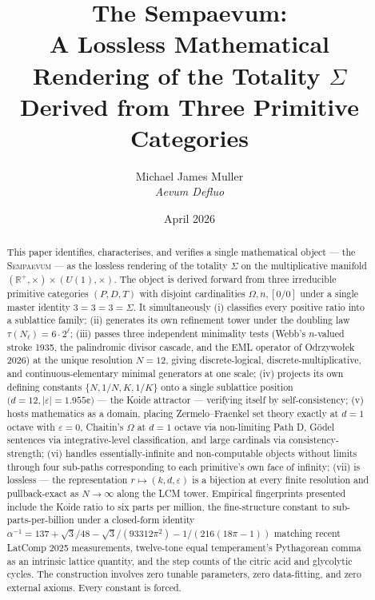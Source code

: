 \documentclass[11pt,a4paper]{article}
\title{\bfseries The Sempaevum:\\[2pt]
A Lossless Mathematical Rendering of the Totality $\Sigma$\\[2pt]
Derived from Three Primitive Categories}
\author{Michael James Muller\\
\small\textit{Aevum Defluo}}
\date{April 2026}
\theoremstyle{definition}
\theoremstyle{remark}
\newcommand{\R}{\mathbb{R}}
\newcommand{\Sempaevum}{\textsc{Sempaevum}}
\begin{document}
\maketitle

\begin{abstract}
\noindent
This paper identifies, characterises, and verifies a single mathematical object — the \Sempaevum{} — as the lossless rendering of the totality $\Sigma$ on the multiplicative manifold $(\R^{+},\times) \times (U(1),\times)$. The object is derived forward from three irreducible primitive categories $(P,D,T)$ with disjoint cardinalities $\Omega, n, [0/0]$ under a single master identity $3=3=3=\Sigma$. It simultaneously (i) classifies every positive ratio into a sublattice family; (ii) generates its own refinement tower under the doubling law $\tau(N_{\ell}) = 6 \cdot 2^{\ell}$; (iii) passes three independent minimality tests (Webb's $n$-valued stroke 1935, the palindromic divisor cascade, and the EML operator of Odrzywołek 2026) at the unique resolution $N=12$, giving discrete-logical, discrete-multiplicative, and continuous-elementary minimal generators at one scale; (iv) projects its own defining constants $\{N, 1/N, K, 1/K\}$ onto a single sublattice position $(d=12, |\varepsilon|=1.955$¢$)$ — the Koide attractor — verifying itself by self-consistency; (v) hosts mathematics as a domain, placing Zermelo--Fraenkel set theory exactly at $d=1$ octave with $\varepsilon=0$, Chaitin's $\Omega$ at $d=1$ octave via non-limiting Path D, Gödel sentences via integrative-level classification, and large cardinals via consistency-strength; (vi) handles essentially-infinite and non-computable objects without limits through four sub-paths corresponding to each primitive's own face of infinity; (vii) is lossless — the representation $r \mapsto (k,d,\varepsilon)$ is a bijection at every finite resolution and pullback-exact as $N \to \infty$ along the LCM tower. Empirical fingerprints presented include the Koide ratio to six parts per million, the fine-structure constant to sub-parts-per-billion under a closed-form identity $\alpha^{-1} = 137 + \sqrt{3}/48 - \sqrt{3}/(93312\pi^{2}) - 1/(216(18\pi-1))$ matching recent LatComp 2025 measurements, twelve-tone equal temperament's Pythagorean comma as an intrinsic lattice quantity, and the step counts of the citric acid and glycolytic cycles. The construction involves zero tunable parameters, zero data-fitting, and zero external axioms. Every constant is forced.
\end{abstract}
\end{document}
